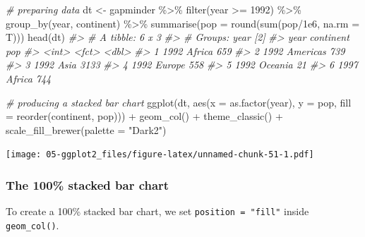 \documentclass[
]{book}
\newenvironment{Shaded}{\begin{snugshade}}{\end{snugshade}}
\newcommand{\AttributeTok}[1]{\textcolor[rgb]{0.77,0.63,0.00}{#1}}
\newcommand{\CommentTok}[1]{\textcolor[rgb]{0.56,0.35,0.01}{\textit{#1}}}
\newcommand{\DecValTok}[1]{\textcolor[rgb]{0.00,0.00,0.81}{#1}}
\newcommand{\FloatTok}[1]{\textcolor[rgb]{0.00,0.00,0.81}{#1}}
\newcommand{\FunctionTok}[1]{\textcolor[rgb]{0.00,0.00,0.00}{#1}}
\newcommand{\NormalTok}[1]{#1}
\newcommand{\OtherTok}[1]{\textcolor[rgb]{0.56,0.35,0.01}{#1}}
\newcommand{\SpecialCharTok}[1]{\textcolor[rgb]{0.00,0.00,0.00}{#1}}
\newcommand{\StringTok}[1]{\textcolor[rgb]{0.31,0.60,0.02}{#1}}
\begin{document}
\begin{Shaded}
\begin{Highlighting}[]
\CommentTok{\# preparing data}
\NormalTok{dt }\OtherTok{\textless{}{-}} 
\NormalTok{gapminder }\SpecialCharTok{\%\textgreater{}\%}
\FunctionTok{filter}\NormalTok{(year }\SpecialCharTok{\textgreater{}=} \DecValTok{1992}\NormalTok{) }\SpecialCharTok{\%\textgreater{}\%}
\FunctionTok{group\_by}\NormalTok{(year, continent) }\SpecialCharTok{\%\textgreater{}\%}
\FunctionTok{summarise}\NormalTok{(}\AttributeTok{pop =} \FunctionTok{round}\NormalTok{(}\FunctionTok{sum}\NormalTok{(pop}\SpecialCharTok{/}\FloatTok{1e6}\NormalTok{, }\AttributeTok{na.rm =}\NormalTok{ T)))}
\FunctionTok{head}\NormalTok{(dt)}
\CommentTok{\#\textgreater{} \# A tibble: 6 x 3}
\CommentTok{\#\textgreater{} \# Groups:   year [2]}
\CommentTok{\#\textgreater{}    year continent   pop}
\CommentTok{\#\textgreater{}   \textless{}int\textgreater{} \textless{}fct\textgreater{}     \textless{}dbl\textgreater{}}
\CommentTok{\#\textgreater{} 1  1992 Africa      659}
\CommentTok{\#\textgreater{} 2  1992 Americas    739}
\CommentTok{\#\textgreater{} 3  1992 Asia       3133}
\CommentTok{\#\textgreater{} 4  1992 Europe      558}
\CommentTok{\#\textgreater{} 5  1992 Oceania      21}
\CommentTok{\#\textgreater{} 6  1997 Africa      744}

\CommentTok{\# producing a stacked bar chart}
\FunctionTok{ggplot}\NormalTok{(dt, }\FunctionTok{aes}\NormalTok{(}\AttributeTok{x =} \FunctionTok{as.factor}\NormalTok{(year), }\AttributeTok{y =}\NormalTok{ pop, }\AttributeTok{fill =} \FunctionTok{reorder}\NormalTok{(continent, pop))) }\SpecialCharTok{+} 
   \FunctionTok{geom\_col}\NormalTok{() }\SpecialCharTok{+}
   \FunctionTok{theme\_classic}\NormalTok{() }\SpecialCharTok{+}
   \FunctionTok{scale\_fill\_brewer}\NormalTok{(}\AttributeTok{palette =} \StringTok{"Dark2"}\NormalTok{)}
\end{Highlighting}
\end{Shaded}

\texttt{[image: 05-ggplot2\_files/figure-latex/unnamed-chunk-51-1.pdf]}

\hypertarget{the-100-stacked-bar-chart}{%
\subsubsection{The 100\% stacked bar chart}\label{the-100-stacked-bar-chart}}

To create a 100\% stacked bar chart, we set \texttt{position\ =\ "fill"} inside \texttt{geom\_col()}.
\end{document}
